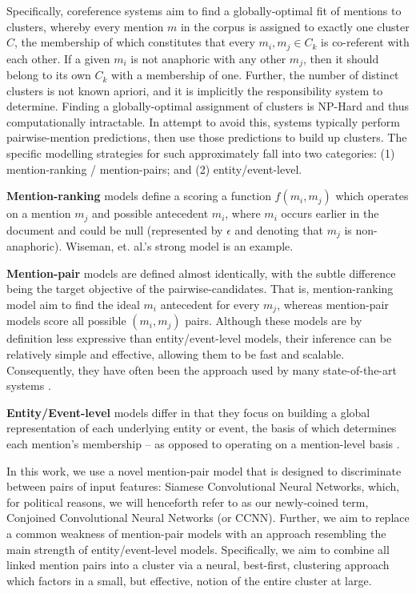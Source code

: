 \documentclass[11pt,a4paper]{article}
\begin{document}
Specifically, coreference systems aim to find a globally-optimal fit of mentions to clusters, whereby every mention $m$ in the corpus is assigned to exactly one cluster $C$, the membership of which constitutes that every ${m_i,m_j} \in C_k$ is co-referent with each other.  If a given $m_i$ is not anaphoric with any other $m_j$, then it should belong to its own $C_k$ with a membership of one.  Further, the number of distinct clusters is not known apriori, and it is implicitly the responsibility system to determine.  Finding a globally-optimal assignment of clusters is NP-Hard and thus computationally intractable.  In attempt to avoid this, systems typically perform pairwise-mention predictions, then use those predictions to build up clusters. The specific modelling strategies for such approximately fall into two categories: (1) mention-ranking / mention-pairs; and (2) entity/event-level.

\textbf{Mention-ranking} models define a scoring a function $f(m_i,m_j)$ which operates on a mention $m_j$ and possible antecedent $m_i$, where $m_i$ occurs earlier in the document and could be null (represented by $\epsilon$ and denoting that $m_j$ is non-anaphoric).  Wiseman, et. al.'s  strong model is an example.

\textbf{Mention-pair} models are defined almost identically, with the subtle difference being the target objective of the pairwise-candidates.  That is, mention-ranking model aim to find the ideal $m_i$ antecedent for every $m_j$, whereas mention-pair models score all possible $(m_i,m_j)$ pairs.  Although these models are by definition less expressive than entity/event-level models, their inference can be relatively simple and effective, allowing them to be fast and scalable.  Consequently, they have often been the approach used by many state-of-the-art systems \cite{Soon:2001:MLA:972597.972602,DBLP:conf/emnlp/DurrettK13}.

\textbf{Entity/Event-level} models differ in that they focus on building a global representation of each underlying entity or event, the basis of which determines each mention's membership -- as opposed to operating on a mention-level basis \cite{DBLP:journals/corr/WisemanRS16,clark2016improving}.

In this work, we use a novel mention-pair model that is designed to discriminate between pairs of input features: Siamese Convolutional Neural Networks, which, for political reasons, we will henceforth refer to as our newly-coined term, Conjoined Convolutional Neural Networks (or CCNN).  Further, we aim to replace a common weakness of mention-pair models with an approach resembling the main strength of entity/event-level models. Specifically, we aim to combine all linked mention pairs into a cluster via a neural, best-first, clustering approach which factors in a small, but effective, notion of the entire cluster at large.
\end{document}
